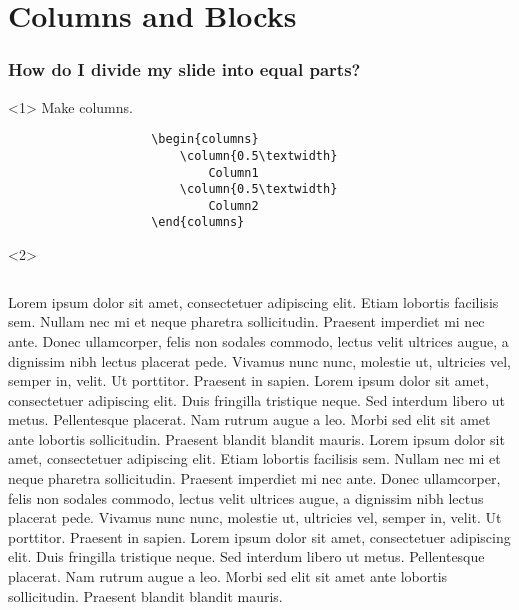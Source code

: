 \documentclass{beamer}
\begin{document}
	\section{Columns and Blocks}
	\begin{frame}[t, fragile]
			\frametitle{How do I divide my slide into equal parts?}
			\begin{onlyenv}<1>
				{\huge Make columns.}
				\vfill
				\begin{verbatim}
					\begin{columns}
						\column{0.5\textwidth}
							Column1
						\column{0.5\textwidth}
							Column2
					\end{columns}
				\end{verbatim}
				\vfill
			\end{onlyenv}
			\begin{onlyenv}<2>
				\begin{columns}
					\column{0.5\textwidth}
						\small
						Lorem ipsum dolor sit amet, consectetuer adipiscing elit. Etiam lobortis facilisis sem. Nullam nec mi et neque pharetra sollicitudin. Praesent imperdiet mi nec ante. Donec ullamcorper, felis non sodales commodo, lectus velit ultrices augue, a dignissim nibh lectus placerat pede. Vivamus nunc nunc, molestie ut, ultricies vel, semper in, velit. Ut porttitor. Praesent in sapien. Lorem ipsum dolor sit amet, consectetuer adipiscing elit. Duis fringilla tristique neque. Sed interdum libero ut metus. Pellentesque placerat. Nam rutrum augue a leo. Morbi sed elit sit amet ante lobortis sollicitudin. Praesent blandit blandit mauris.
					\column{0.5\textwidth}
						\small
						Lorem ipsum dolor sit amet, consectetuer adipiscing elit. Etiam lobortis facilisis sem. Nullam nec mi et neque pharetra sollicitudin. Praesent imperdiet mi nec ante. Donec ullamcorper, felis non sodales commodo, lectus velit ultrices augue, a dignissim nibh lectus placerat pede. Vivamus nunc nunc, molestie ut, ultricies vel, semper in, velit. Ut porttitor. Praesent in sapien. Lorem ipsum dolor sit amet, consectetuer adipiscing elit. Duis fringilla tristique neque. Sed interdum libero ut metus. Pellentesque placerat. Nam rutrum augue a leo. Morbi sed elit sit amet ante lobortis sollicitudin. Praesent blandit blandit mauris.
				\end{columns}
			\end{onlyenv}
\end{frame}
\end{document}

